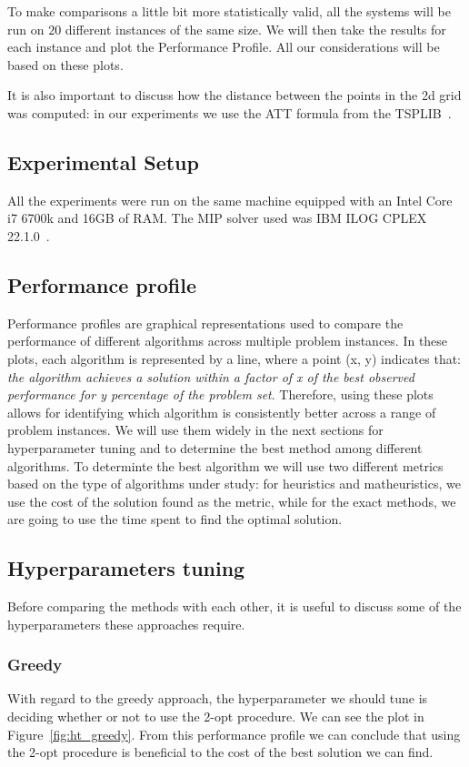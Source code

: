 \documentclass{article}
\begin{document}
To make comparisons a little bit more statistically valid, all the systems will be run on
$20$ different instances of the same size. We will then take the results for each instance
and plot the Performance Profile. All our considerations will be based on these plots.

It is also important to discuss how the distance between the points in the 2d
grid was computed: in our experiments we use the ATT formula from the TSPLIB~\cite{reinelt1991tsplib}.

\subsection{Experimental Setup}
All the experiments were run on the same machine equipped with an Intel Core i7 6700k
and 16GB of RAM. The MIP solver used was IBM ILOG CPLEX 22.1.0~\cite{cplex-docs}.

\subsection{Performance profile}
Performance profiles are graphical representations used to compare the performance of different algorithms
across multiple problem instances.
In these plots, each algorithm is represented by a line, where a point (x, y) indicates that: \textit{the algorithm achieves
a solution within a factor of x of the best observed performance for y percentage of the problem set}.
Therefore, using these plots allows for identifying which algorithm is consistently better across a range
of problem instances. We will use them widely in the next sections for hyperparameter tuning and
to determine the best method among different algorithms.
To determinte the best algorithm we will use two different metrics based on the type of algorithms
under study: for heuristics and matheuristics, we use the cost of the solution found as the metric, while
for the exact methods, we are going to use the time spent to find the optimal solution.

\subsection{Hyperparameters tuning}
Before comparing the methods with each other, it is useful to discuss some
of the hyperparameters these approaches require.

\subsubsection{Greedy}
With regard to the greedy approach, the hyperparameter we should tune is
deciding whether or not to use the 2-opt procedure. We can see the plot
in Figure~\ref{fig:ht_greedy}. From this performance profile we can conclude
that using the 2-opt procedure is beneficial to the cost of the best
solution we can find.
\end{document}
